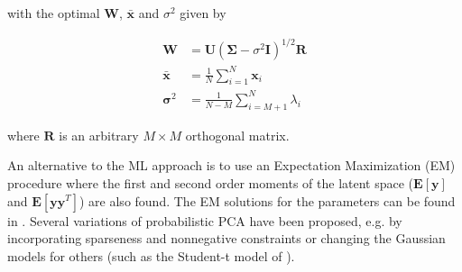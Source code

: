 with the optimal $\mathbf{W}$, $\bar{\mathbf{x}}$ and $\sigma^2$ given by

\begin{equation}
	\begin{aligned}
		\mathbf{W} & = \mathbf{U} (\mathbf{\Sigma} - \sigma^2 \mathbf{I})^{1/2} \mathbf{R} 
		\\
		\bar{\mathbf{x}} & = \frac{1}{N} \sum_{i=1}^N \mathbf{x}_i
		\\
		\mathbf{\sigma}^2 & = \frac{1}{N-M} \sum_{i=M+1}^N \lambda_i
	\end{aligned}
\end{equation}

where $\mathbf{R}$ is an arbitrary $M \times M$ orthogonal matrix.

An alternative to the ML approach is to use an Expectation Maximization (EM) procedure where the first and second order moments of the latent space ($\mathbf{E}[\mathbf{y}]$ and $\mathbf{E}[\mathbf{y} \mathbf{y}^T]$) are also found.
The EM solutions for the parameters can be found in \cite{bishop2006pattern, tipping1999probabilistic}. Several variations of probabilistic PCA have been proposed, e.g. by incorporating sparseness and nonnegative constraints \cite{guan2009sparse} or changing the Gaussian models for others (such as the Student-t model of \cite{khan2004robust}).
